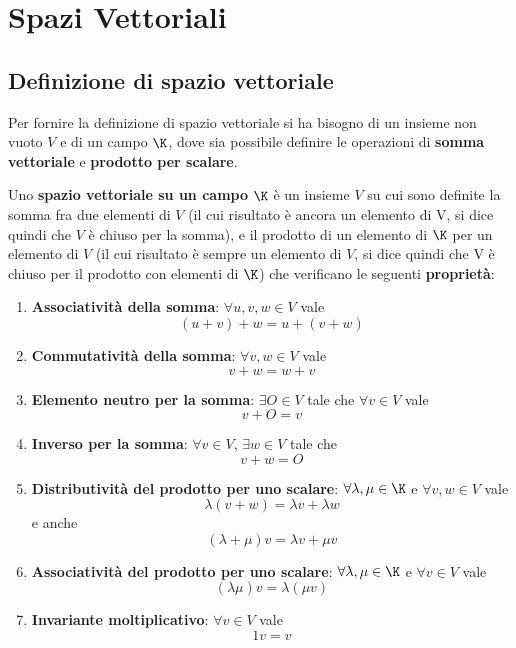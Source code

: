 \chapter{Spazi Vettoriali}

\section{Definizione di spazio vettoriale}

Per fornire la definizione di spazio vettoriale si ha bisogno di un insieme non
vuoto $V$ e di un campo $\K$, dove sia possibile definire le operazioni di
\textbf{somma vettoriale} e \textbf{prodotto per scalare}.

\begin{definition}
	Uno \textbf{spazio vettoriale su un campo} $\K$ è un insieme $V$ su cui sono
	definite la somma fra due elementi di $V$ (il cui risultato è ancora un
	elemento di V, si dice quindi che $V$ è chiuso per la somma), e il prodotto
	di un elemento di $\K$ per un elemento di $V$ (il cui risultato è sempre un
	elemento di $V$, si dice quindi che V è chiuso per il prodotto con elementi
	di $\K$) che verificano le seguenti \textbf{proprietà}:
	\begin{enumerate}
		\item \textbf{Associatività della somma}: $\forall u, v, w \in V$ vale
		      \[ (u + v) + w = u + (v + w) \]
		\item \textbf{Commutatività della somma}: $\forall v, w \in V$ vale
		      \[ v + w = w + v \]
		\item \textbf{Elemento neutro per la somma}: $\exists O \in V$ tale che
		      $\forall v \in V$ vale
		      \[ v + O = v \]
		\item \textbf{Inverso per la somma}: $\forall v \in V$, $\exists w \in V$ tale che
		      \[ v + w = O \]
		\item \textbf{Distributività del prodotto per uno scalare}:
		      $\forall \lambda, \mu \in \K$ e $\forall v, w \in V$ vale
		      \[ \lambda(v + w) = \lambda v + \lambda w \]
		      e anche
		      \[ (\lambda + \mu)v = \lambda v + \mu v \]
		\item \textbf{Associatività del prodotto per uno scalare}:
		      $\forall \lambda, \mu \in \K$ e $\forall v \in V$ vale
		      \[ (\lambda \mu)v = \lambda(\mu v) \]
		\item \textbf{Invariante moltiplicativo}: $\forall v \in V$ vale
		      \[ 1v = v \]
	\end{enumerate}
\end{definition}

